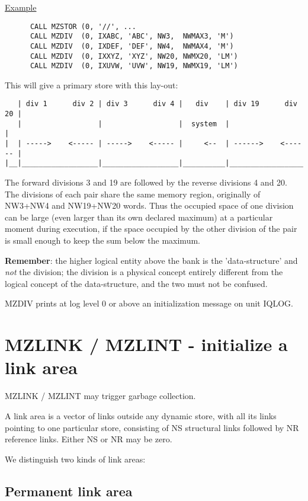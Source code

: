 \ul{Example}
\begin{verbatim}
      CALL MZSTOR (0, '//', ...
      CALL MZDIV  (0, IXABC, 'ABC', NW3,  NWMAX3, 'M')
      CALL MZDIV  (0, IXDEF, 'DEF', NW4,  NWMAX4, 'M')
      CALL MZDIV  (0, IXXYZ, 'XYZ', NW20, NWMX20, 'LM')
      CALL MZDIV  (0, IXUVW, 'UVW', NW19, NWMX19, 'LM')
\end{verbatim} 

This will give a primary store with this lay-out:

\begin{verbatim}
   | div 1      div 2 | div 3      div 4 |   div    | div 19      div 20 |
   |                  |                  |  system  |                    |
|  | ----->    <----- | ----->    <----- |     <--  | ------>    <------ |
|__|__________________|__________________|__________|____________________|
\end{verbatim} 

The forward divisions 3 and 19 are followed by the reverse
divisions 4 and 20.
The divisions of each pair share the same memory region,
originally of NW3+NW4 and NW19+NW20 words.
Thus the occupied space of one division can be large
(even larger than its own declared maximum) at a particular
moment during execution,
if the space occupied by the other division of the pair is small
enough to keep the sum below the maximum.

{\large\bf Remember}: the higher logical entity above the bank
is the 'data-structure' and {\large\em not} the division;
the division is a physical concept entirely different
from the logical concept of the data-structure,
and the two must not be confused.

MZDIV prints at log level 0 or above
an initialization message on unit IQLOG.

\section{MZLINK / MZLINT - initialize a link area}

MZLINK / MZLINT may trigger garbage collection.

A link area is a vector of links outside any dynamic store,
with all its links pointing to one particular store,
consisting of NS structural links followed by NR reference links.
Either NS or NR may be zero.

We distinguish two kinds of link areas:

\subsection*{Permanent link area}

